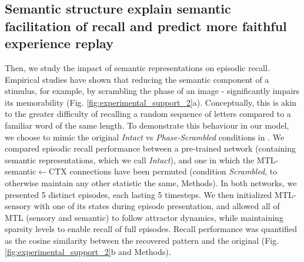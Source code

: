 \documentclass{article}
\begin{document}
\subsection*{Semantic structure explain semantic facilitation of recall and predict more faithful experience replay}
Then, we study the impact of semantic representations on episodic recall. Empirical studies have shown that reducing the semantic component of a stimulus, for example, by scrambling the phase of an image  - significantly impairs its memorability (Fig. \ref{fig:experimental_support_2}a). Conceptually, this is akin to the greater difficulty of recalling a random sequence of letters compared to a familiar word of the same length.
\newline\newline
To demonstrate this behaviour in our model, we choose to mimic the original \textit{Intact} vs \textit{Phase-Scrambled} conditions in .  We compared episodic recall performance between a pre-trained network (containing semantic representations, which we call \textit{Intact}), and one in which the MTL-semantic$\leftarrow$CTX connections have been permuted (condition \textit{Scrambled}, to otherwise maintain any other statistic the same, Methods). In both networks, we presented 5 distinct episodes, each lasting 5 timesteps. We then initialized MTL-sensory with one of its states during episode presentation, and allowed all of MTL (sensory and semantic) to follow attractor dynamics, while maintaining sparsity levels to enable recall of full episodes. Recall performance was quantified as the cosine similarity between the recovered pattern and the original (Fig. \ref{fig:experimental_support_2}b and Methods).
\newline\newline
\end{document}
